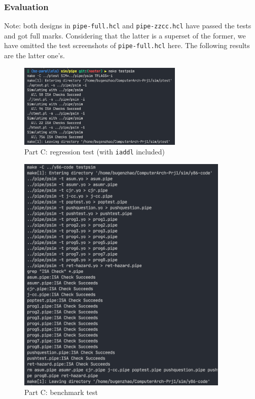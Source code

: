\documentclass[12pt,a4paper]{article}
\begin{document}
\subsubsection{Evaluation}
Note: both designs in \texttt{pipe-full.hcl} and \texttt{pipe-zzcc.hcl} have passed the tests and got full marks. Considering that the latter is a superset of the former, we have omitted the test screenshots of \texttt{pipe-full.hcl} here. The following results are the latter one's.
\begin{figure}[H] %
        \centering %
        \includegraphics[width=0.7\textwidth]{partC-regression-test.png} %
        \caption{Part C: regression test (with \texttt{iaddl} included)} %
        \label{Fig.partC-regression} %
\end{figure}
\begin{figure}[H] %
        \centering %
        \includegraphics[width=0.9\textwidth]{partC-test2.png} %
        \caption{Part C: benchmark test} %
        \label{Fig.partC-benchmark} %
\end{figure}
\end{document}
